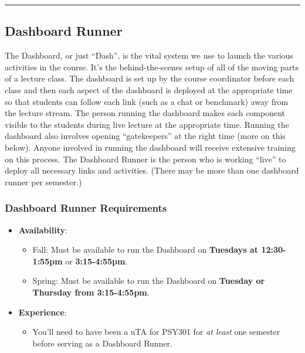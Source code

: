 \documentclass[
]{article}
\providecommand{\tightlist}{%
  \setlength{\itemsep}{0pt}\setlength{\parskip}{0pt}}
\begin{document}
\begin{center}\rule{0.5\linewidth}{0.5pt}\end{center}

\hypertarget{dashboard-runner}{%
\subsection{Dashboard Runner}\label{dashboard-runner}}

The Dashboard, or just ``Dash'', is the vital system we use to launch the various activities in the course. It's the behind-the-scenes setup of all of the moving parts of a lecture class. The dashboard is set up by the course coordinator before each class and then each aspect of the dashboard is deployed at the appropriate time so that students can follow each link (such as a chat or benchmark) away from the lecture stream. The person running the dashboard makes each component visible to the students during live lecture at the appropriate time. Running the dashboard also involves opening ``gatekeepers'' at the right time (more on this below). Anyone involved in running the dashboard will receive extensive training on this process. The Dashboard Runner is the person who is working ``live'' to deploy all necessary links and activities. (There may be more than one dashboard runner per semester.)

\hypertarget{dashboard-runner-requirements}{%
\subsubsection{Dashboard Runner Requirements}\label{dashboard-runner-requirements}}

\begin{itemize}
\tightlist
\item
  \textbf{Availability}:

  \begin{itemize}
  \tightlist
  \item
    Fall: Must be available to run the Dashboard on \textbf{Tuesdays at 12:30-1:55pm} or \textbf{3:15-4:55pm}.
  \item
    Spring: Must be available to run the Dashboard on \textbf{Tuesday or Thursday from 3:15-4:55pm}.
  \end{itemize}
\item
  \textbf{Experience}:

  \begin{itemize}
  \tightlist
  \item
    You'll need to have been a uTA for PSY301 for \emph{at least} one semester before serving as a Dashboard Runner.
  \end{itemize}
\end{itemize}
\end{document}
